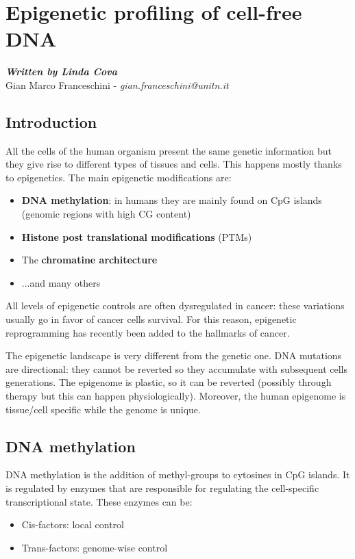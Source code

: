 \graphicspath{{chapters/MethylationImages/}}

\chapter{Epigenetic profiling of cell-free DNA}

\textbf{\textit{Written by Linda Cova}}\\

Gian Marco Franceschini -  \textit{gian.franceschini@unitn.it}

\section{Introduction}

All the cells of the human organism present the same genetic information but
they give rise to different types of tissues and cells. This happens mostly
thanks to epigenetics. The main epigenetic modifications are:
\begin{itemize}
    \item \textbf{DNA methylation}: in humans they are mainly found on CpG
    islands (genomic regions with high CG content)
    \item \textbf{Histone post translational modifications} (PTMs)
    \item The \textbf{chromatine architecture}
    \item ...and many others
\end{itemize}


All levels of epigenetic controls are often dysregulated in cancer: these
variations usually go in favor of cancer cells survival. For this reason,
epigenetic reprogramming has recently been added to the hallmarks of cancer.

The epigenetic landscape is very different from the genetic one. DNA mutations
are directional: they cannot be reverted so they accumulate with subsequent
cells generations. The epigenome is plastic, so it can be reverted (possibly
through therapy but this can happen physiologically). Moreover, the human
epigenome is tissue/cell specific while the genome is unique.

\section{DNA methylation}

DNA methylation is the addition of methyl-groups to cytosines in CpG islands. It
is regulated by enzymes that are responsible for regulating the cell-specific
transcriptional state. These enzymes can be:
\begin{itemize}
    \item Cis-factors: local control
    \item Trans-factors: genome-wise control
\end{itemize}

